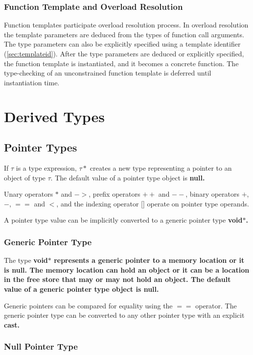 \documentclass[a4paper,oneside,11pt]{article}
\begin{document}
\subsubsection{Function Template and Overload Resolution}

Function templates participate overload resolution process.
In overload resolution the template parameters are deduced from the types of function call arguments.
The type parameters can also be explicitly specified using a template identifier (\ref{sec:templateid}).
After the type parameters are deduced or explicitly specified, the function template is instantiated,
and it becomes a concrete function.
The type-checking of an unconstrained function template is deferred until instantiation time.

\section{Derived Types}

\subsection{Pointer Types}

If $\tau$ is a type expression, $\tau*$ creates a new type representing a pointer to an object of type $\tau$.
The default value of a pointer type object is \bf{null}.

Unary operators $*$ and $->$, prefix operators $++$ and $--$, binary operators $+$, $-$, $==$ and $<$,
and the indexing operator [] operate on pointer type operands.

A pointer type value can be implicitly converted to a generic pointer type \bf{void$*$}.

\subsubsection{Generic Pointer Type}

The type \bf{void$*$} represents a generic pointer to a memory location or it is \bf{null}.
The memory location can hold an object or it can be a location in the free store that
may or may not hold an object.
The default value of a generic pointer type object is \bf{null}.

Generic pointers can be compared for equality using the $==$ operator.
The generic pointer type can be converted to any other pointer type with an explicit \bf{cast}.

\subsubsection{Null Pointer Type}
\end{document}
